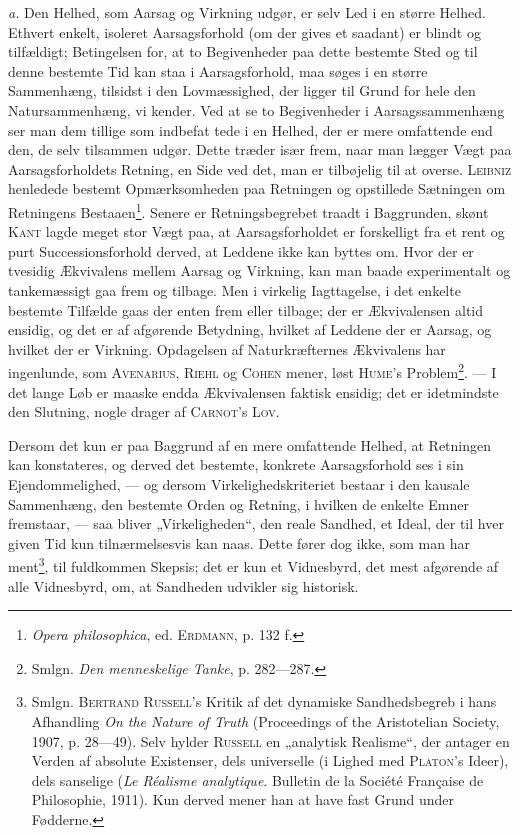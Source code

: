 \documentclass[12pt]{article}
\newcommand{\opage}[1]{\marginnote{\footnotesize\textit{[#1]}}}
\begin{document}
\textit{a.} Den Helhed, som Aarsag og Virkning udgør, er selv Led i en større
Helhed. Ethvert enkelt, isoleret Aarsagsforhold (om der gives et saadant) er
blindt og tilfældigt; Betingelsen for, at to Begivenheder paa dette bestemte
Sted og til denne bestemte Tid kan staa i Aarsagsforhold, maa søges i en større
Sammenhæng, tilsidst i den Lovmæssighed, der ligger til Grund for hele den
Natursammenhæng, vi kender. Ved at se to Begivenheder i Aarsagssammenhæng ser
man dem tillige som indbefat%
\setcounter{footnote}{0}%
\opage{49}tede i en Helhed, der er mere omfattende end den, de selv tilsammen
udgør. Dette træder især frem, naar man lægger Vægt paa Aarsagsforholdets
Retning, en Side ved det, man er tilbøjelig til at overse. \textsc{Leibniz}
henledede bestemt Opmærksomheden paa Retningen og opstillede Sætningen om
Retningens Bestaaen\footnote{\textit{Opera philosophica}, ed. \textsc{Erdmann},
p. 132 f.}. Senere er Retningsbegrebet traadt i Baggrunden, skønt \textsc{Kant}
lagde meget stor Vægt paa, at Aarsagsforholdet er forskelligt fra et rent og
purt Successionsforhold derved, at Leddene ikke kan byttes om. Hvor der er
tvesidig Ækvivalens mellem Aarsag og Virkning, kan man baade experimentalt og
tankemæssigt gaa frem og tilbage. Men i virkelig Iagttagelse, i det enkelte
bestemte Tilfælde gaas der enten frem eller tilbage; der er Ækvivalensen altid
ensidig, og det er af afgørende Betydning, hvilket af Leddene der er Aarsag, og
hvilket der er Virkning. Opdagelsen af Naturkræfternes Ækvivalens har
ingenlunde, som \textsc{Avenarius}, \textsc{Riehl} og \textsc{Cohen} mener, løst
\textsc{Hume}'s Problem\footnote{Smlgn. \textit{Den menneskelige Tanke}, p.
282---287.}. --- I det lange Løb er maaske endda Ækvivalensen faktisk ensidig;
det er idetmindste den Slutning, nogle drager af \textsc{Carnot}'s \textsc{Lov}.

Dersom det kun er paa Baggrund af en mere omfattende Helhed, at Retningen kan
konstateres, og derved det bestemte, konkrete Aarsagsforhold ses i sin
Ejendommelighed, --- og dersom Virkelighedskriteriet bestaar i den kausale
Sammenhæng, den bestemte Orden og Retning, i hvilken de enkelte Emner fremstaar,
--- saa bliver „Virkeligheden“, den reale Sandhed, et Ideal, der til hver given
Tid kun tilnærmelsesvis kan naas. Dette fører dog ikke, som man har
ment\footnote{Smlgn. \textsc{Bertrand Russell}'s Kritik af det dynamiske
Sandhedsbegreb i hans Afhandling \textit{On the Nature of Truth} (Proceedings of
the Aristotelian Society, 1907, p. 28---49). Selv hylder \textsc{Russell} en
„analytisk Realisme“, der antager en Verden af absolute Existenser, dels
universelle (i Lighed med \textsc{Platon}'s Ideer), dels sanselige (\textit{Le
Réalisme analytique}. Bulletin de la Société Française de Philosophie, 1911).
Kun derved mener han at have fast Grund under Fødderne.}, til fuldkommen
Skepsis; det er kun et Vidnesbyrd, det mest afgørende af alle Vidnesbyrd, om, at
Sandheden udvikler sig historisk.
\end{document}
